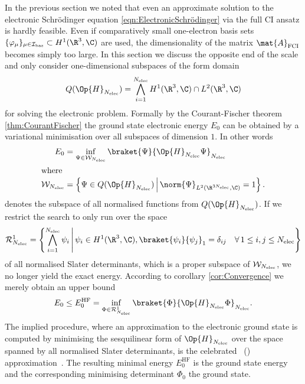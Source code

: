 In the previous section we noted that even an approximate
solution to the electronic Schrödinger equation \eqref{eqn:ElectronicSchrödinger}
via the full CI ansatz
is hardly feasible.
Even if comparatively small one-electron basis sets
$\{ \varphi_\mu \}_{\mu\in\Ibas} \subset H^1(\R^3,\C)$
are used,
the dimensionality
of the matrix $\mat{A}_\text{FCI}$ becomes simply too large.
In this section we discuss the opposite end of the scale and
only consider one-dimensional subspaces of the form domain
\[ Q(\Op{H}_{\Nelec}) = \bigwedge_{i=1}^{\Nelec} H^1(\R^3, \C) \cap L^2(\R^3, \C) \]
for solving the electronic problem.
Formally by the Courant-Fischer theorem \eqref{thm:CourantFischer}
the ground state electronic energy $E_0$ can be obtained by
a variational minimisation over all subspaces of dimension $1$.
In other words
\begin{align}
	\label{eqn:GroundStateVariational}
	E_0 &= \inf_{\Psi \in \mathcal{W}_{\Nelec}} \braket{\Psi}{\Op{H}_{\Nelec} \Psi}_{\Nelec} \\
\intertext{where}
	\label{eqn:NormalisedFormDomain}
	\mathcal{W}_{\Nelec} &= \left\{ \Psi \in Q(\Op{H}_{\Nelec})
	\, \middle| \,
	\norm{\Psi}_{L^2(\R^{3 \Nelec}, \C)} = 1 \right\}.
\end{align}
denotes the subspace of all normalised functions from $Q(\Op{H}_{\Nelec})$.
If we restrict the search to only run over the space
\begin{equation}
	\mathcal{R}^1_{\Nelec} = \left\{ \bigwedge_{i=1}^{\Nelec} \psi_i
	\, \middle| \,
	\psi_i \in H^1(\R^3, \C),
	\braket{\psi_i}{\psi_j}_1 = \delta_{ij}
	\quad \forall \, 1\leq i,j\leq \Nelec
	\right\}
	\label{eqn:RankOneSubspace}
\end{equation}
of all normalised Slater determinants,
which is a proper subspace of $\mathcal{W}_{N_\text{elec}}$,
we no longer yield the exact energy.
According to corollary \vref{cor:Convergence} we merely obtain an upper bound
\begin{equation}
	E_0 \leq E_0^\text{HF} = \inf_{\Phi \in \mathcal{R}^1_{\Nelec}}
	\braket{\Phi}{\Op{H}_{\Nelec} \Phi}_{\Nelec}.
	\label{eqn:HFDeterminant}
\end{equation}
The implied procedure,
where an approximation to the electronic ground state
is computed by minimising the sesquilinear form of $\Op{H}_{\Nelec}$
over the space spanned by all normalised Slater determinants,
is the celebrated ~(\HF) approximation~\cite{Fock1930}.
The resulting minimal energy $E_0^\text{HF}$
is the \HF ground state energy
and the corresponding minimising determinant
$\Phi_0$ the \HF ground state.


